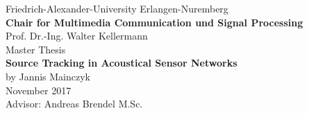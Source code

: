 \begin{titlepage}
\begin{center}
\vspace*{-1cm}
 {\LARGE Friedrich-Alexander-University Erlangen-Nuremberg}\\
\vspace{1cm}
 {\Large \textbf{Chair for Multimedia Communication und Signal Processing}}\\
\vspace{1cm}
 {\Large Prof. Dr.-Ing. Walter Kellermann}\\
\vspace{3cm}
 {\LARGE Master Thesis}\\
\vspace{2cm}
 {\LARGE \textbf{Source Tracking in Acoustical Sensor Networks}}\\
\vspace{2cm}
{\LARGE by Jannis Mainczyk}\\
\vspace{3cm}
{\Large November 2017}\\
\vspace{1cm}
{\Large Advisor: Andreas Brendel M.Sc.}
\end{center}
\end{titlepage}